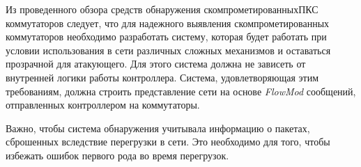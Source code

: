 \documentclass[../thesis.tex]{subfiles}
\begin{document}
Из проведенного обзора средств обнаружения скомпрометированных\linebreak ПКС коммутаторов следует, что для надежного выявления скомпрометированных коммутаторов необходимо разработать систему, которая будет работать при условии использования в сети различных сложных механизмов и оставаться прозрачной для атакующего.
Для этого система должна не зависеть от внутренней логики работы контроллера.
Система, удовлетворяющая этим требованиям, должна строить представление сети на основе \textit{FlowMod} сообщений, отправленных контроллером на коммутаторы.

Важно, чтобы система обнаружения учитывала информацию о пакетах, сброшенных вследствие перегрузки в сети.
Это необходимо для того, чтобы избежать ошибок первого рода во время перегрузок.
\end{document}
